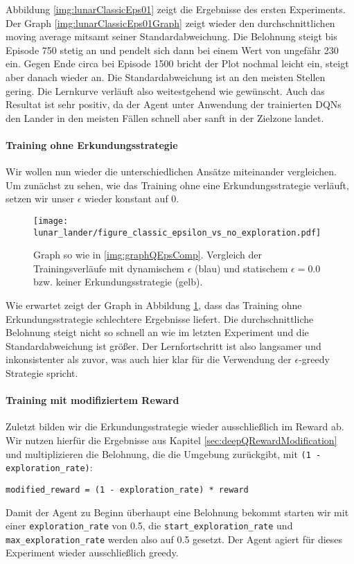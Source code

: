 Abbildung \ref{img:lunarClassicEps01} zeigt die Ergebnisse des ersten Experiments. Der Graph \ref{img:lunarClassicEps01Graph} zeigt wieder den durchschnittlichen moving average mitsamt seiner Standardabweichung. Die Belohnung steigt bis Episode 750 stetig an und pendelt sich dann bei einem Wert von ungefähr 230 ein. Gegen Ende circa bei Episode 1500 bricht der Plot nochmal leicht ein, steigt aber danach wieder an. Die Standardabweichung ist an den meisten Stellen gering. Die Lernkurve verläuft also weitestgehend wie gewünscht. Auch das Resultat ist sehr positiv, da der Agent unter Anwendung der trainierten DQNs den Lander in den meisten Fällen schnell aber sanft in der Zielzone landet.

\paragraph{Training ohne Erkundungsstrategie}
Wir wollen nun wieder die unterschiedlichen Ansätze miteinander vergleichen. Um zunächst zu sehen, wie das Training ohne eine Erkundungsstrategie verläuft, setzen wir unser $ \epsilon $ wieder konstant auf 0.

\begin{figure}[h!]
    \centering
    \texttt{[image: lunar\_lander/figure\_classic\_epsilon\_vs\_no\_exploration.pdf]}
    \caption{Graph so wie in \ref{img:graphQEpsComp}. Vergleich der Trainingsverläufe mit dynamischem $ \epsilon $ (blau) und statischem $ \epsilon = 0.0 $ bzw. keiner Erkundungsstrategie (gelb).} \label{img:lunarClassicEps01VsNoExploration}
\end{figure}

Wie erwartet zeigt der Graph in Abbildung \ref{img:lunarClassicEps01VsNoExploration}, dass das Training ohne Erkundungsstrategie schlechtere Ergebnisse liefert. Die durchschnittliche Belohnung steigt nicht so schnell an wie im letzten Experiment und die Standardabweichung ist größer. Der Lernfortschritt ist also langsamer und inkonsistenter als zuvor, was auch hier klar für die Verwendung der $ \epsilon $-greedy Strategie spricht.

\paragraph{Training mit modifiziertem Reward}
Zuletzt bilden wir die Erkundungsstrategie wieder ausschließlich im Reward ab. Wir nutzen hierfür die Ergebnisse aus Kapitel \ref{sec:deepQRewardModification} und multiplizieren die Belohnung, die die Umgebung zurückgibt, mit \texttt{(1 - exploration_rate)}:
\begin{verbatim}
modified_reward = (1 - exploration_rate) * reward
\end{verbatim}
Damit der Agent zu Beginn überhaupt eine Belohnung bekommt starten wir mit einer \texttt{exploration_rate} von 0.5, die \texttt{start_exploration_rate} und \texttt{max_exploration_rate} werden also auf 0.5 gesetzt. Der Agent agiert für dieses Experiment wieder ausschließlich greedy.

